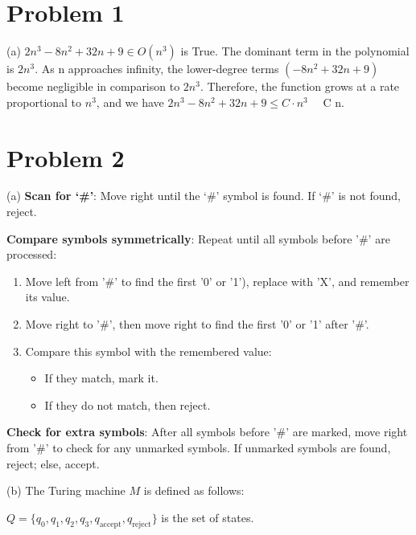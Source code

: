 \documentclass[12 pt]{article}
\begin{document}
\section*{Problem 1}

(a) $2n^3 - 8n^2 + 32n + 9 \in O(n^3)$ is True. The dominant term in the polynomial is $2n^3$. As n approaches infinity, the lower-degree terms $(-8n^2 + 32n + 9)$ become negligible in comparison to $2n^3$. Therefore, the function grows at a rate proportional to $n^3$, and we have $2n^3 - 8n^2 + 32n + 9 \leq C \cdot n^3 \quad$  C  n.





\vspace{1cm}

\section*{Problem 2}

(a) 
\textbf{Scan for ‘\#’}: Move right until the ‘\#’ symbol is found. If ‘\#’ is not found, reject.


\textbf{Compare symbols symmetrically}: Repeat until all symbols before '\#' are processed:
    \begin{enumerate}
        \item Move left from '\#' to find the first '0' or '1'), replace with 'X', and remember its value.
        \item Move right to '\#', then move right to find the first '0' or '1' after '\#'.
        \item Compare this symbol with the remembered value:
        \begin{itemize}
            \item If they match, mark it.
            \item If they do not match, then reject.
        \end{itemize}
    \end{enumerate}

\textbf{Check for extra symbols}: After all symbols before '\#' are marked, move right from '\#' to check for any unmarked symbols. If unmarked symbols are found, reject; else, accept.

\vspace{1cm}

(b)
\noindent The Turing machine \( M \) is defined as follows:


\( Q = \{ q_0, q_1, q_2, q_3, q_{\text{accept}}, q_{\text{reject}} \} \) is the set of states.
\end{document}
